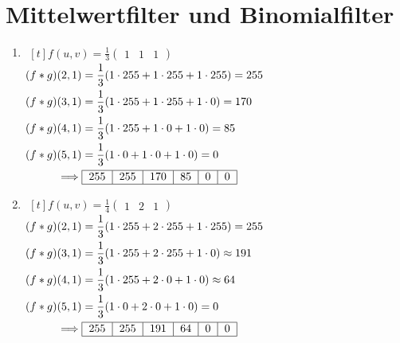 \section{Mittelwertfilter und Binomialfilter}
\begin{enumerate}
	\setlength\itemsep{2em}
	\item $\begin{aligned}[t]
			      f(u,v) =\frac{1}{3} \begin{pmatrix} 1 & 1 & 1 \end{pmatrix}
		      \end{aligned}$\\

	      $\begin{aligned}[t]
			      (f\ast g)(2,1) & =\frac{1}{3} (1 \cdot 255 + 1 \cdot 255 + 1 \cdot 255 ) = 255 \\
			      (f\ast g)(3,1) & =\frac{1}{3} (1 \cdot 255 + 1 \cdot 255 + 1 \cdot 0 ) = 170   \\
			      (f\ast g)(4,1) & =\frac{1}{3} (1 \cdot 255 + 1 \cdot 0 + 1 \cdot 0 ) = 85      \\
			      (f\ast g)(5,1) & =\frac{1}{3} (1 \cdot 0 + 1 \cdot 0 + 1 \cdot 0 ) = 0         \\
			      \implies       & \begin{tabular}{ |c|c|c|c|c|c| }
				                       \hline
				                       255 & 255 & 170 & 85 & 0 & 0 \\
				                       \hline
			                       \end{tabular}
		      \end{aligned}$

	\item $\begin{aligned}[t]
			      f(u,v) =\frac{1}{4} \begin{pmatrix} 1 & 2 & 1 \end{pmatrix}
		      \end{aligned}$\\

	      $\begin{aligned}[t]
			      (f\ast g)(2,1) & =\frac{1}{3} (1 \cdot 255 + 2 \cdot 255 + 1 \cdot 255 ) = 255     \\
			      (f\ast g)(3,1) & =\frac{1}{3} (1 \cdot 255 + 2 \cdot 255 + 1 \cdot 0 ) \approx 191 \\
			      (f\ast g)(4,1) & =\frac{1}{3} (1 \cdot 255 + 2 \cdot 0 + 1 \cdot 0 ) \approx 64    \\
			      (f\ast g)(5,1) & =\frac{1}{3} (1 \cdot 0 + 2 \cdot 0 + 1 \cdot 0 ) = 0             \\
			      \implies       & \begin{tabular}{ |c|c|c|c|c|c| }
				                       \hline
				                       255 & 255 & 191 & 64 & 0 & 0 \\
				                       \hline
			                       \end{tabular}
		      \end{aligned}$


\end{enumerate}
